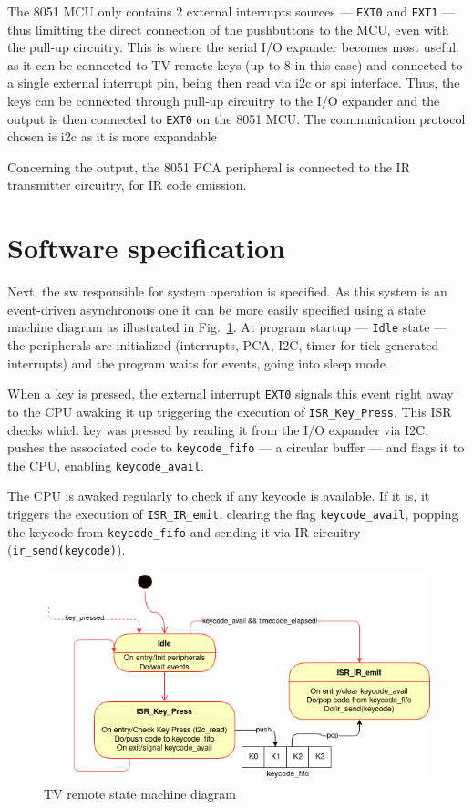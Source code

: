 The 8051 MCU only contains 2 external interrupts sources --- \texttt{EXT0} and
\texttt{EXT1} --- thus limitting the direct connection of the pushbuttons to the
MCU, even with the pull-up circuitry. This is where the serial I/O expander
becomes most useful, as it can be connected to TV remote keys (up to 8 in this
case) and connected to a single external interrupt pin, being then read via
\gls{i2c} or \gls{spi} interface. Thus, the keys can be connected through
pull-up circuitry to the I/O expander and the output is then connected to
\texttt{EXT0} on the 8051 MCU. The communication protocol chosen is \gls{i2c} as
it is more expandable

Concerning the output, the 8051 PCA peripheral is connected to the IR
transmitter circuitry, for IR code emission.
%
  \vspace{-5mm}
%  
\section{Software specification}
\label{sec:sw-specs}
Next, the \gls{sw} responsible for system operation is specified. As this system
is an event-driven asynchronous one it can be more easily specified using a
state machine diagram as illustrated in Fig.~\ref{fig:state-mach}. At program
startup --- \texttt{Idle} state --- the peripherals are initialized (interrupts, PCA, I2C, timer for tick
generated interrupts) and the program waits for events, going into sleep
mode.

When a key is pressed, the external interrupt \texttt{EXT0} signals this
event right away to the CPU awaking it up triggering the execution of
\texttt{ISR\_Key\_Press}. This ISR checks which key was pressed by reading it
from the I/O expander via I2C, pushes the associated code to
\texttt{keycode\_fifo} --- a circular buffer --- and flags it to the CPU, enabling \texttt{keycode\_avail}.

The CPU is awaked regularly to check if any keycode is available. If it is, it
triggers the execution of \texttt{ISR\_IR\_emit}, clearing the flag
\texttt{keycode\_avail}, popping the keycode from \texttt{keycode\_fifo} and
sending it via IR circuitry (\texttt{ir\_send(keycode)}).
%
  \vspace{-5mm}
%  
\begin{figure}[htb!]
\centering
    \includegraphics[width=0.7\columnwidth]{./img/state-mach.png}
  \caption{TV remote state machine diagram}%
\label{fig:state-mach}
\end{figure}
%
  \vspace{-5mm}
%  
